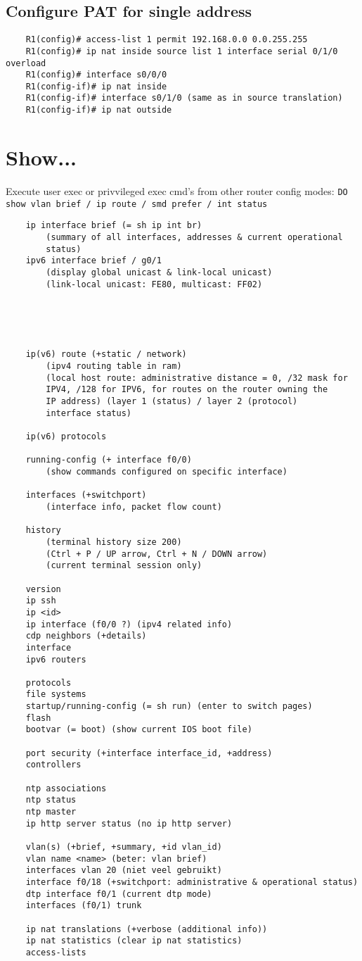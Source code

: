 \documentclass[10pt, a4paper]{article}
\begin{document}
	\subsection{Configure PAT for single address}
	\begin{lstlisting}
	R1(config)# access-list 1 permit 192.168.0.0 0.0.255.255
	R1(config)# ip nat inside source list 1 interface serial 0/1/0 overload
	R1(config)# interface s0/0/0
	R1(config-if)# ip nat inside
	R1(config-if)# interface s0/1/0 (same as in source translation)
	R1(config-if)# ip nat outside
	\end{lstlisting}


	\section{Show...}
	Execute user exec or privvileged exec cmd's from other
	router config modes: \texttt{DO show vlan brief / ip route / smd prefer / int status} \\

	\begin{lstlisting}
	ip interface brief (= sh ip int br)
		(summary of all interfaces, addresses & current operational
		status)
	ipv6 interface brief / g0/1
		(display global unicast & link-local unicast)
		(link-local unicast: FE80, multicast: FF02)





	ip(v6) route (+static / network)
		(ipv4 routing table in ram)
		(local host route: administrative distance = 0, /32 mask for
		IPV4, /128 for IPV6, for routes on the router owning the
		IP address) (layer 1 (status) / layer 2 (protocol)
		interface status)

	ip(v6) protocols

	running-config (+ interface f0/0)
		(show commands configured on specific interface)

	interfaces (+switchport)
		(interface info, packet flow count)

	history
		(terminal history size 200)
		(Ctrl + P / UP arrow, Ctrl + N / DOWN arrow)
		(current terminal session only)

	version
	ip ssh
	ip <id>
	ip interface (f0/0 ?) (ipv4 related info)
	cdp neighbors (+details)
	interface
	ipv6 routers

	protocols
	file systems
	startup/running-config (= sh run) (enter to switch pages)
	flash
	bootvar (= boot) (show current IOS boot file)

	port security (+interface interface_id, +address)
	controllers

	ntp associations
	ntp status
	ntp master
	ip http server status (no ip http server)

	vlan(s) (+brief, +summary, +id vlan_id)
	vlan name <name> (beter: vlan brief)
	interfaces vlan 20 (niet veel gebruikt)
	interface f0/18 (+switchport: administrative & operational status)
	dtp interface f0/1 (current dtp mode)
	interfaces (f0/1) trunk

	ip nat translations (+verbose (additional info))
	ip nat statistics (clear ip nat statistics)
	access-lists
	\end{lstlisting}
\end{document}
